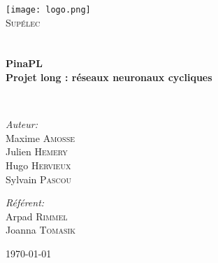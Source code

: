 
\begin{titlepage}
\begin{center}

\texttt{[image: logo.png]}~\\[1cm]

\textsc{\LARGE Supélec}\\[1.5cm]

\textsc{\Large }\\[0.5cm]

\HRule \\[0.4cm]

{\huge \bfseries PinaPL\\
Projet long : réseaux neuronaux cycliques \\[0.4cm] }

\HRule \\[1.5cm]

\begin{minipage}{0.4\textwidth}
\begin{flushleft} \large
\emph{Auteur:}\\
Maxime \textsc{Amosse}\\
Julien \textsc{Hemery}\\
Hugo \textsc{Hervieux}\\
Sylvain \textsc{Pascou}
\end{flushleft}
\end{minipage}
\begin{minipage}{0.4\textwidth}
\begin{flushright} \large
\emph{Référent:} \\
Arpad \textsc{Rimmel} \\
Joanna \textsc{Tomasik}
\end{flushright}
\end{minipage}

\vfill

{\large \today}

\end{center}
\end{titlepage}